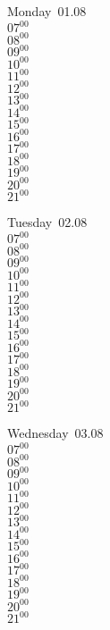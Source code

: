 \documentclass[11pt,a4paper]{book}\usepackage[]{graphicx}\usepackage[]{color}
\begin{document}
\begin{headerbox}
\end{headerbox}
\begin{weekdaybox}
  Monday~01.08\\
  { 
  \vfill
  $07^{00}$\\
$08^{00}$\\
$09^{00}$\\
$10^{00}$\\
$11^{00}$\\
$12^{00}$\\
$13^{00}$\\
$14^{00}$\\
$15^{00}$\\
$16^{00}$\\
$17^{00}$\\
$18^{00}$\\
$19^{00}$\\
$20^{00}$\\
$21^{00}$\\
  }
\end{weekdaybox}
\begin{weekdaybox}
  Tuesday~02.08\\
  { 
  \vfill
  $07^{00}$\\
$08^{00}$\\
$09^{00}$\\
$10^{00}$\\
$11^{00}$\\
$12^{00}$\\
$13^{00}$\\
$14^{00}$\\
$15^{00}$\\
$16^{00}$\\
$17^{00}$\\
$18^{00}$\\
$19^{00}$\\
$20^{00}$\\
$21^{00}$\\
  }
\end{weekdaybox}
\begin{weekdaybox}
  Wednesday~03.08\\
  { 
  \vfill
  $07^{00}$\\
$08^{00}$\\
$09^{00}$\\
$10^{00}$\\
$11^{00}$\\
$12^{00}$\\
$13^{00}$\\
$14^{00}$\\
$15^{00}$\\
$16^{00}$\\
$17^{00}$\\
$18^{00}$\\
$19^{00}$\\
$20^{00}$\\
$21^{00}$\\
  }
\end{weekdaybox}
\end{document}
